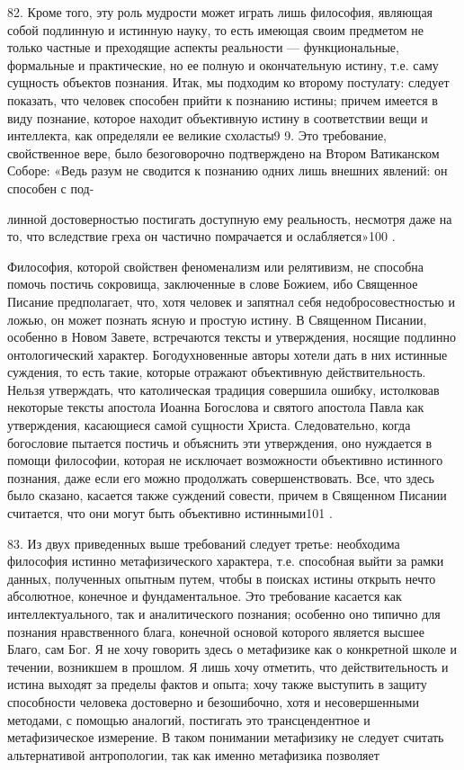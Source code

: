 \documentclass[a5paper,10pt]{article}
\begin{document}
82. Кроме того, эту роль мудрости может играть лишь философия, являющая собой
подлинную и истинную науку, то есть имеющая своим предметом не только частные и
преходящие аспекты реальности — функциональные, формальные и практические, но
ее полную и окончательную истину, т.е. саму сущность объектов познания. Итак,
мы подходим ко второму постулату: следует показать, что человек способен прийти
к познанию истины; причем имеется в виду познание, которое находит объективную
истину в соответствии вещи и интеллекта, как определяли ее великие схоласты9 9.
Это требование, свойственное вере, было безоговорочно подтверждено на Втором
Ватиканском Соборе: «Ведь разум не сводится к познанию одних лишь внешних
явлений: он способен с под-

линной достоверностью постигать доступную ему реальность, несмотря даже на то,
что вследствие греха он частично помрачается и ослабляется»100 .

Философия, которой свойствен феноменализм или релятивизм, не способна помочь
постичь сокровища, заключенные в слове Божием, ибо Священное Писание
предполагает, что, хотя человек и запятнал себя недобросовестностью и ложью, он
может познать ясную и простую истину. В Священном Писании, особенно в Новом
Завете, встречаются тексты и утверждения, носящие подлинно онтологический
характер. Богодухновенные авторы хотели дать в них истинные суждения, то есть
такие, которые отражают объективную действительность. Нельзя утверждать, что
католическая традиция совершила ошибку, истолковав некоторые тексты апостола
Иоанна Богослова и святого апостола Павла как утверждения, касающиеся самой
сущности Христа. Следовательно, когда богословие пытается постичь и объяснить
эти утверждения, оно нуждается в помощи философии, которая не исключает
возможности объективно истинного познания, даже если его можно продолжать
совершенствовать. Все, что здесь было сказано, касается также суждений совести,
причем в Священном Писании считается, что они могут быть объективно
истинными101 .

83. Из двух приведенных выше требований следует третье: необходима философия
истинно метафизического характера, т.е. способная выйти за рамки данных,
полученных опытным путем, чтобы в поисках истины открыть нечто абсолютное,
конечное и фундаментальное. Это требование касается как интеллектуального, так
и аналитического познания; особенно оно типично для познания нравственного
блага, конечной основой которого является высшее Благо, сам Бог. Я не хочу
говорить здесь о метафизике как о конкретной школе и течении, возникшем в
прошлом. Я лишь хочу отметить, что действительность и истина выходят за пределы
фактов и опыта; хочу также выступить в защиту способности человека достоверно и
безошибочно, хотя и несовершенными методами, с помощью аналогий, постигать это
трансцендентное и метафизическое измерение. В таком понимании метафизику не
следует считать альтернативой антропологии, так как именно метафизика позволяет
\end{document}
